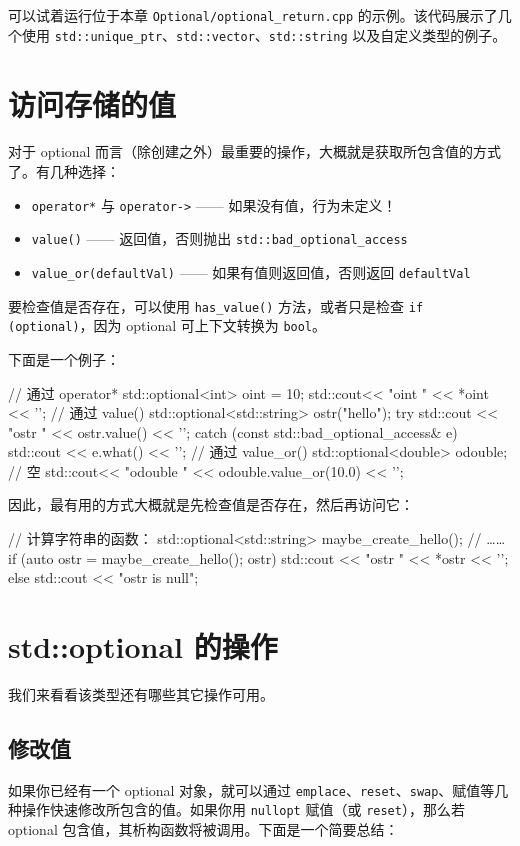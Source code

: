 可以试着运行位于本章 \texttt{Optional/optional\_return.cpp} 的示例。该代码展示了几个使用 \texttt{std::unique\_ptr}、\texttt{std::vector}、\texttt{std::string} 以及自定义类型的例子。

\section{访问存储的值}
对于 optional 而言（除创建之外）最重要的操作，大概就是获取所包含值的方式了。有几种选择：
\begin{itemize}
\item \texttt{operator*} 与 \texttt{operator->} —— 如果没有值，行为未定义！
\item \texttt{value()} —— 返回值，否则抛出 \texttt{std::bad\_optional\_access}
\item \texttt{value\_or(defaultVal)} —— 如果有值则返回值，否则返回 \texttt{defaultVal}
\end{itemize}

要检查值是否存在，可以使用 \texttt{has\_value()} 方法，或者只是检查 \texttt{if (optional)}，因为 optional 可上下文转换为 \texttt{bool}。

下面是一个例子：

\begin{codebox}[cpp]
// 通过 operator*
std::optional<int> oint = 10;
std::cout<< "oint " << *oint << '\n';
// 通过 value()
std::optional<std::string> ostr("hello");
try
{
std::cout << "ostr " << ostr.value() << '\n';
}
catch (const std::bad_optional_access& e)
{
std::cout << e.what() << '\n';
}
// 通过 value_or()
std::optional<double> odouble; // 空
std::cout<< "odouble " << odouble.value_or(10.0) << '\n';
\end{codebox}

因此，最有用的方式大概就是先检查值是否存在，然后再访问它：

\begin{codebox}[cpp]
// 计算字符串的函数：
std::optional<std::string> maybe_create_hello();
// ……
if (auto ostr = maybe_create_hello(); ostr)
std::cout << "ostr " << *ostr << '\n';
else
std::cout << "ostr is null\n";
\end{codebox}

\section{std::optional 的操作}
我们来看看该类型还有哪些其它操作可用。

\subsection{修改值}
如果你已经有一个 optional 对象，就可以通过 \texttt{emplace}、\texttt{reset}、\texttt{swap}、赋值等几种操作快速修改所包含的值。如果你用 \texttt{nullopt} 赋值（或 \texttt{reset}），那么若 optional 包含值，其析构函数将被调用。下面是一个简要总结：

